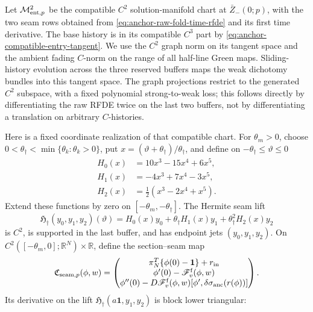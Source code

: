 \begin{lemma}
Let \(\mathcal M_{{\rm ent},p}^2\) be the compatible \(C^2\)
solution-manifold chart at \(\bar Z_-(0;p)\), with the two seam rows obtained
from \cref{eq:anchor-raw-fold-time-rfde} and its first time derivative.
The base history is in its compatible \(C^3\) part by
\cref{eq:anchor-compatible-entry-tangent}.  We use the \(C^2\) graph norm
on its tangent space and the ambient fading \(C\)-norm on the range of all
half-line Green maps.  Sliding-history evolution across the three reserved
buffers maps the weak dichotomy bundles into this tangent space.  The graph
projections restrict to the generated \(C^2\) subspace, with a fixed
polynomial strong-to-weak loss; this follows directly by differentiating the
raw RFDE twice on the last two buffers, not by differentiating a translation
on arbitrary \(C\)-histories.

Here is a fixed coordinate realization of that compatible chart.  For
\(\theta_m>0\), choose
\(0<\theta_\dagger<\min\{\theta_k:\theta_k>0\}\), put
\(x=(\vartheta+\theta_\dagger)/\theta_\dagger\), and define on
\(-\theta_\dagger\le\vartheta\le0\)
\begin{align*}
 H_0(x)&=10x^3-15x^4+6x^5,\\
 H_1(x)&=-4x^3+7x^4-3x^5,\\
 H_2(x)&=\tfrac12(x^3-2x^4+x^5).
\end{align*}
Extend these functions by zero on
\([-\theta_m,-\theta_\dagger]\).  The Hermite seam lift
\begin{equation}
 \mathfrak H_\dagger(y_0,y_1,y_2)(\vartheta)
 =H_0(x)y_0+\theta_\dagger H_1(x)y_1
       +\theta_\dagger^2H_2(x)y_2                 \label{eq:anchor-entry-Hermite-seam-lift}
\end{equation}
is \(C^2\), is supported in the last buffer, and has endpoint jets
\((y_0,y_1,y_2)\).  On
\(C^2([-\theta_m,0];\mathbb R^N)\times\mathbb R\), define the section--seam
map
\begin{equation}
 \mathfrak C_{{\rm seam},p}(\phi,w)
 =\begin{pmatrix}
   \pi_N^T\{\phi(0)-\mathbf1\}+r_{\rm in}\\
   \phi'(0)-\mathscr F_v^{\rm f}(\phi,w)\\
   \phi''(0)-D\mathscr F_v^{\rm f}(\phi,w)
       [\phi',\delta\sigma_{\rm anc}(r(\phi))]
  \end{pmatrix}.                                    \label{eq:anchor-entry-section-seam-map}
\end{equation}
Its derivative on the lift
\(\mathfrak H_\dagger(a\mathbf1,y_1,y_2)\) is block lower triangular:

\end{lemma}
